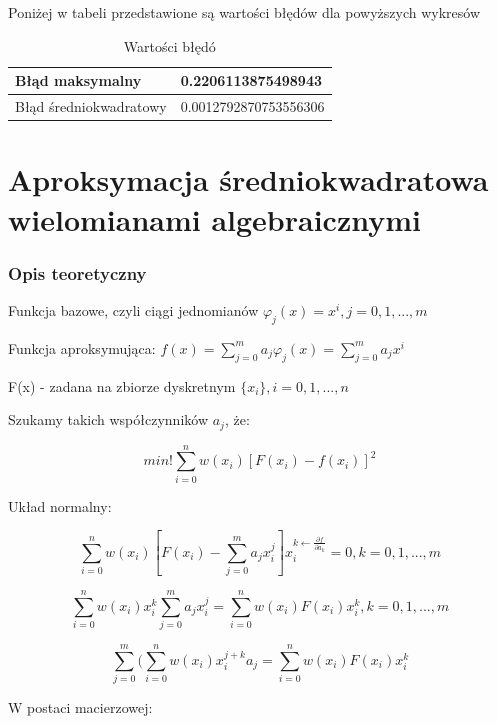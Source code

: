 \documentclass{article}
\begin{document}
Poniżej w tabeli przedstawione są wartości błędów dla powyższych wykresów

\begin{table}[!ht]
    \centering
    \begin{tabular}{|l|l|}
    \hline
        Błąd maksymalny & 0.2206113875498943 \\ \hline
        Błąd średniokwadratowy & 0.0012792870753556306 \\ \hline
    \end{tabular}
    \caption{Wartości błędó}
\end{table}

\newpage

\section{Aproksymacja średniokwadratowa wielomianami algebraicznymi}

\subsubsection{Opis teoretyczny}

\noindent
Funkcja bazowe, czyli ciągi jednomianów \(\varphi _j(x) = x^i, j = 0, 1, ..., m\)

\noindent
Funkcja aproksymująca: \(f(x) = \sum_{j=0}^{m}a_j\varphi_j(x) = \sum_{j=0}^{m}a_jx^i\)

\noindent
F(x) - zadana na zbiorze dyskretnym \(\{x_i\}, i = 0, 1, ..., n\)

\noindent
Szukamy takich współczynników \(a_j\), że:

\[min!\sum_{i=0}^{n}w(x_i)[F(x_i) - f(x_i)]^2\]

\noindent
Układ normalny:

\[\sum_{i = 0}^{n}w(x_i)[F(x_i) - \sum_{j=0}^{m}a_jx_i^j]x_i^{k\longleftarrow \frac{\partial f}{\partial a_k}} = 0, k = 0, 1, ..., m\]

\[\sum_{i = 0}^{n}w(x_i)x_i^k\sum_{j=0}^{m}a_jx_i^j = \sum_{i=0}^{n}w(x_i)F(x_i)x_i^k, k =0,1,...,m\]

\[\sum_{j=0}^{m}(\sum_{i=0}^{n}w(x_i)x_i^{j+k}a_j = \sum_{i=0}^{n}w(x_i)F(x_i)x_i^k\]

\noindent
W postaci macierzowej:
\end{document}
